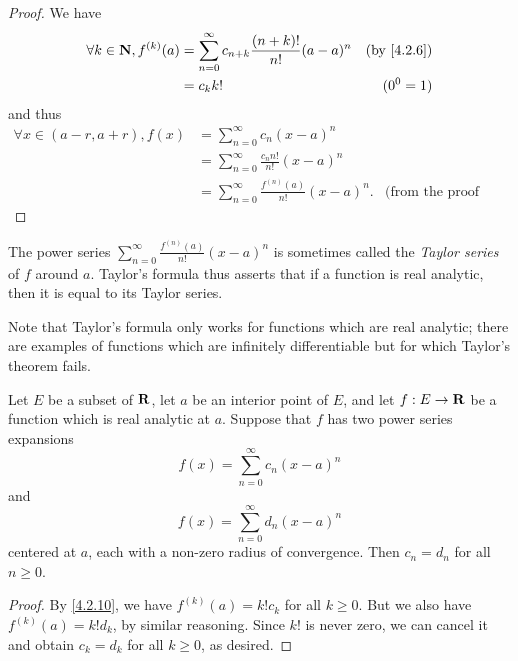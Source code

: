 \begin{proof}
  We have
  \begin{align*}
    \forall k \in \N, f^{(k)}(a) & = \sum_{n = 0}^\infty c_{n + k} \frac{(n + k)!}{n!} (a - a)^n & \text{(by \cref{4.2.6})} \\
                                 & = c_k k!                                                      & (0^0 = 1)
  \end{align*}
  and thus
  \begin{align*}
    \forall x \in (a - r, a + r), f(x) & = \sum_{n = 0}^\infty c_n (x - a)^n                                                    \\
                                       & = \sum_{n = 0}^\infty \frac{c_n n!}{n!} (x - a)^n                                      \\
                                       & = \sum_{n = 0}^\infty \frac{f^{(n)}(a)}{n!} (x - a)^n. & \text{(from the proof above)}
  \end{align*}
\end{proof}

\begin{note}
  The power series \(\sum_{n = 0}^\infty \frac{f^{(n)}(a)}{n!} (x - a)^n\) is sometimes called the \emph{Taylor series} of \(f\) around \(a\).
  Taylor's formula thus asserts that if a function is real analytic, then it is equal to its Taylor series.
\end{note}

\begin{remark}\label{4.2.11}
  Note that Taylor's formula only works for functions which are real analytic;
  there are examples of functions which are infinitely differentiable but for which Taylor's theorem fails.
\end{remark}

\begin{corollary}\label{4.2.12}
  Let \(E\) be a subset of \(\mathbf{R}\), let \(a\) be an interior point of \(E\), and let \(f : E \to \mathbf{R}\) be a function which is real analytic at \(a\).
  Suppose that \(f\) has two power series expansions
  \[
    f(x) = \sum_{n = 0}^\infty c_n (x - a)^n
  \]
  and
  \[
    f(x) = \sum_{n = 0}^\infty d_n (x - a)^n
  \]
  centered at \(a\), each with a non-zero radius of convergence.
  Then \(c_n = d_n\) for all \(n \geq 0\).
\end{corollary}

\begin{proof}
  By \cref{4.2.10}, we have \(f^{(k)}(a) = k! c_k\) for all \(k \geq 0\).
  But we also have \(f^{(k)}(a) = k! d_k\), by similar reasoning.
  Since \(k!\) is never zero, we can cancel it and obtain \(c_k = d_k\) for all \(k \geq 0\), as desired.
\end{proof}

